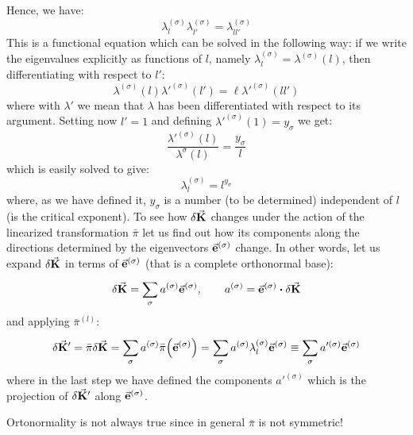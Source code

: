 \documentclass[../../Main/Main.tex]{subfiles}
\begin{document}
Hence, we have:
\begin{equation}
  \lambda _l^{(\sigma )} \lambda _{l'}^{(\sigma )} =  \lambda _{ll'}^{(\sigma )}
  \label{eq:20_3}
\end{equation}
This is a functional equation which can be solved in the following way:  if we write the eigenvalues explicitly as functions of \( l \), namely \( \lambda _l^{(\sigma )}= \lambda^{(\sigma )}  (l)\), then differentiating with respect to \( l' \):
\begin{equation*}
   \lambda ^{(\sigma )}(l )\lambda '^{(\sigma )}(l')=\ell \lambda '^{(\sigma )}(l l ')
\end{equation*}
where with \( \lambda ' \)  we mean that \( \lambda  \)  has been differentiated with respect to its argument. Setting now \( l'=1 \)  and defining \( \lambda'^{(\sigma )} (1) = y_\sigma \)  we get:
\begin{equation*}
  \frac{\lambda'^{(\sigma )} (l)}{\lambda^\sigma (l)} = \frac{ y_\sigma}{l}
\end{equation*}
which is easily solved to give:
\begin{equation}
   \lambda _{l}^{(\sigma )} = l^{y_\sigma}
\end{equation}
where, as we have defined it, \( y_\sigma \) is a number (to be determined) independent of \( l \)  (is the critical exponent). To see how \( \delta \va{K} \) changes under the action of the linearized transformation  \( \bar{\pi }  \) let us find out how its components along the directions determined by the eigenvectors \( \va{e}^{(\sigma )} \) change.  In other words, let us expand \( \delta \va{K} \) in terms of \( \va{e}^{(\sigma )} \) (that is a complete orthonormal base):
\begin{equation}
  \delta \va{K} = \sum_{\sigma }^{} a^{(\sigma )} \va{e}^{(\sigma )}, \qquad a^{(\sigma )} = \va{e}^{(\sigma )} \vdot \delta \va{K}
\end{equation}
and applying \( \bar{\pi }^{(l)}  \):
\begin{equation}
  \delta \va{K}' = \bar{\pi } \delta \va{K} = \sum_{\sigma }^{} a^{(\sigma )} \bar{\pi } \qty(\va{e}^{(\sigma )})
  = \sum_{\sigma }^{} a^{(\sigma )} \lambda_l ^{(\sigma )} \va{e}^{(\sigma )}
  \equiv  \sum_{\sigma }^{} a'^{(\sigma )} \va{e}^{(\sigma )}
\end{equation}
where in the last step we have defined the components \( a'^{(\sigma )} \) which is the projection of \( \delta \va{K}' \) along \( \va{e}^{(\sigma )} \).
\begin{remark}
Ortonormality is not always true since in general \( \bar{\pi }  \) is not symmetric!
  \end{remark}
\end{document}
